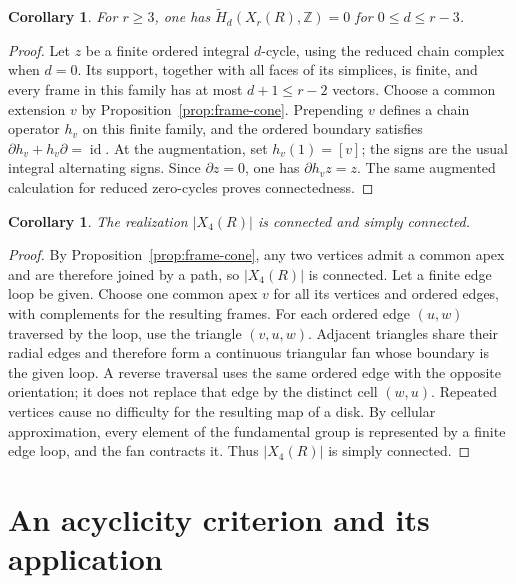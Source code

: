 \documentclass[11pt]{amsart}
\newcommand{\Z}{\mathbb Z}
\DeclareMathOperator{\id}{id}
\newtheorem{corollary}[theorem]{Corollary}
\theoremstyle{definition}
\theoremstyle{remark}
\numberwithin{equation}{section}
\begin{document}
\begin{corollary}\label{cor:frame-homology}
For $r\geq3$, one has $\widetilde H_d(X_r(R),\Z)=0$ for $0\leq d\leq r-3$.
\end{corollary}

\begin{proof}
Let $z$ be a finite ordered integral $d$-cycle, using the reduced chain complex when $d=0$. Its support, together with all faces of its simplices, is finite, and every frame in this family has at most $d+1\leq r-2$ vectors. Choose a common extension $v$ by Proposition~\ref{prop:frame-cone}. Prepending $v$ defines a chain operator $h_v$ on this finite family, and the ordered boundary satisfies $\partial h_v+h_v\partial=\id$. At the augmentation, set $h_v(1)=[v]$; the signs are the usual integral alternating signs. Since $\partial z=0$, one has $\partial h_vz=z$. The same augmented calculation for reduced zero-cycles proves connectedness.
\end{proof}

\begin{corollary}\label{cor:frame-simple-connectivity}
The realization $|X_4(R)|$ is connected and simply connected.
\end{corollary}

\begin{proof}
By Proposition~\ref{prop:frame-cone}, any two vertices admit a common apex and are therefore joined by a path, so $|X_4(R)|$ is connected. Let a finite edge loop be given. Choose one common apex $v$ for all its vertices and ordered edges, with complements for the resulting frames. For each ordered edge $(u,w)$ traversed by the loop, use the triangle $(v,u,w)$. Adjacent triangles share their radial edges and therefore form a continuous triangular fan whose boundary is the given loop. A reverse traversal uses the same ordered edge with the opposite orientation; it does not replace that edge by the distinct cell $(w,u)$. Repeated vertices cause no difficulty for the resulting map of a disk. By cellular approximation, every element of the fundamental group is represented by a finite edge loop, and the fan contracts it. Thus $|X_4(R)|$ is simply connected.
\end{proof}

\section{An acyclicity criterion and its application}
\label{sec:acyclicity-criterion}
\end{document}
